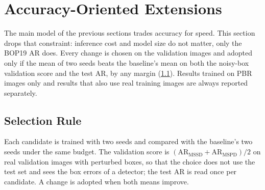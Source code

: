 \section{Accuracy-Oriented Extensions}
\label{sec:accuracy}

The main model of the previous sections trades accuracy for speed. This section drops that
constraint: inference cost and model size do not matter, only the BOP19 AR does. Every change is
chosen on the validation images and adopted only if the mean of two seeds beats the baseline's
mean on both the noisy-box validation score and the test AR, by any margin
(\cref{sec:acc:rule}). Results trained on PBR images only and results that also use real training
images are always reported separately.

\subsection{Selection Rule}
\label{sec:acc:rule}
Each candidate is trained with two seeds and compared with the baseline's two seeds under the same
budget. The validation score is $(\mathrm{AR}_\mathrm{MSSD}+\mathrm{AR}_\mathrm{MSPD})/2$ on real
validation images with perturbed boxes, so that the choice does not use the test set and sees the
box errors of a detector; the test AR is read once per candidate. A change is adopted when both
means improve.

